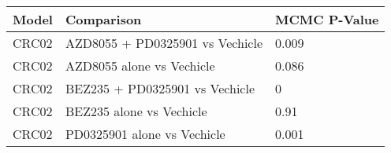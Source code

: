\begin{table}[ht]
\centering
\begin{tabular}{lll}
  \hline
Model & Comparison & MCMC P-Value \\ 
  \hline
CRC02 & AZD8055 + PD0325901 vs Vechicle & 0.009 \\ 
  CRC02 & AZD8055 alone vs Vechicle & 0.086 \\ 
  CRC02 & BEZ235 + PD0325901 vs Vechicle & 0 \\ 
  CRC02 & BEZ235 alone vs Vechicle & 0.91 \\ 
  CRC02 & PD0325901 alone vs Vechicle & 0.001 \\ 
   \hline
\end{tabular}
\end{table}
